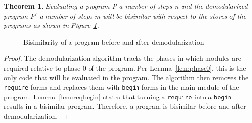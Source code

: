 \newtheorem*{theorem}{Theorem}
\begin{theorem}
Evaluating a program P a number of steps n and the demodularized program $P'$ a number of steps m will be bisimilar with respect to the stores of the programs as shown in Figure~\ref{fig:bisim.tex}.
\end{theorem}

\begin{figure}[h]
  \centering
  
  \caption{Bisimilarity of a program before and after demodularization}
  \label{fig:bisim.tex}
\end{figure}


\begin{proof}
  The demodularization algorithm tracks the phases in which modules are required relative to phase 0 of the program.
  Per Lemma~\ref{lem:phase0}, this is the only code that will be evaluated in the program. 
  The algorithm then removes the \texttt{require} forms and replaces them with \texttt{begin} forms in the main module of the program. 
  Lemma~\ref{lem:reqbegin} states that turning a \texttt{require} into a \texttt{begin} results in a bisimilar program.
  Therefore, a program is bisimilar before and after demodularization. 
\end{proof}


